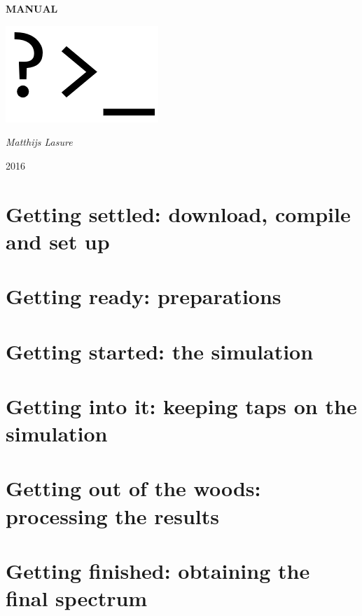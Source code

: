 \documentclass[a4paper,fleqn]{report}
\begin{document}
	
	\pagestyle{MyStyle}
	
	\begin{titlepage}
		\centering
		\vspace{5cm}

		{\huge\bfseries MANUAL\par}
		\vspace{1.5cm}
		\includegraphics[width=0.5\linewidth]{images/prompt.png}
		\vfill
		
		{\Large\itshape Matthijs Lasure\par}
		
		\vspace{1.5cm}
		
		{\large 2016\par}
		
	\end{titlepage}
	
	\tableofcontents
	
	\chapter{Getting settled: download, compile and set up}
	
	\chapter{Getting ready: preparations}
	
	\chapter{Getting started: the simulation}
	
	\chapter{Getting into it: keeping taps on the simulation}
	
	\chapter{Getting out of the woods: processing the results}
	
	\chapter{Getting finished: obtaining the final spectrum}
	
\end{document}
